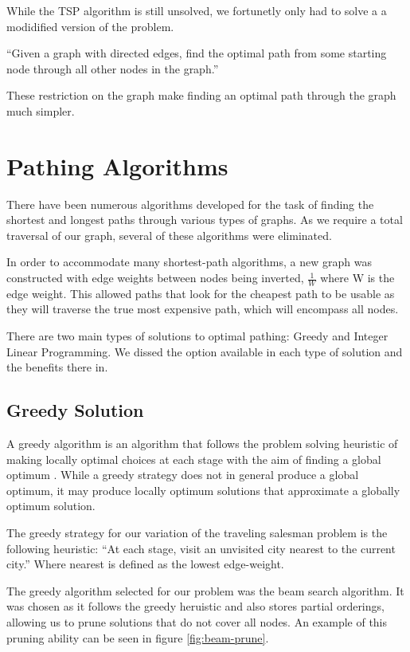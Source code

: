\documentclass[bsc,frontabs,twoside,singlespacing,parskip,deptreport]{infthesis}     %
\begin{document}
While the TSP algorithm is still unsolved, we fortunetly only had to solve a a modidified version of the problem.\\

\begin{center}
  \enquote{Given a graph with directed edges, find the optimal path from some starting node through all other nodes in
  the graph.}
\end{center}

These restriction on the graph make finding an optimal path through the graph much simpler.


\section{Pathing Algorithms}
There have been numerous algorithms developed for the task of finding the shortest and longest paths through various types of graphs.
As we require a total traversal of our graph, several of these algorithms were eliminated.

In order to accommodate many shortest-path algorithms, a new graph was constructed with edge weights between nodes being inverted,
$\frac{1}{W}$ where W is the edge weight. This allowed paths that look for the cheapest path to be usable as they will traverse the
true most expensive path, which will encompass all nodes.

There are two main types of solutions to optimal pathing: Greedy and Integer Linear Programming.
We dissed the option available in each type of solution and the benefits there in.

\subsection{Greedy Solution}
A greedy algorithm is an algorithm that follows the problem solving heuristic of making locally optimal choices at each stage with the aim
of finding a global optimum \cite{black2004dictionary}.
While a greedy strategy does not in general produce a global optimum, it may produce locally optimum solutions that approximate a globally optimum solution.


The greedy strategy for our variation of the traveling salesman problem is the following heuristic:
``At each stage, visit an unvisited city nearest to the current city.''
Where nearest is defined as the lowest edge-weight.


The greedy algorithm selected for our problem was the beam search algorithm.
It was chosen as it follows the greedy heruistic and also stores partial orderings, allowing us to prune solutions that do not cover all nodes.
An example of this pruning ability can be seen in figure \ref{fig:beam-prune}.
\end{document}
